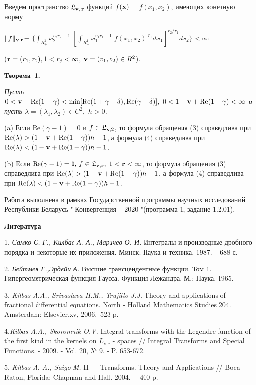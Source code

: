 Введем пространство  $\mathfrak{L}_{{\bf v},\,{\bf r}}$ функций
$f({\bf{x}})$$=f(x_{1},x_{2})$, имеющих конечную норму

\noindent$ \|f\|_{\bf{v},\bf{r}}$=
 $ \{\int_{R_{+}^{1}}x_{2}^{v_{2}r_{2}-1}$
$[\int_{R_{+}^{1}}x_{1}^{v_{1}r_{1}-1}
|f(x_{1},x_{2})|^{r_{1}}dx_{1}]^{r_{2}/r_{1}}dx_{2}\} <\infty$

 \noindent(${\bf r}=(r_{1},r_{2}), 1<{ r_{j}}<\infty$,
 ${\bf v}=(v_{1},v_{2})\in { R}^{2}$).


 \textbf{Теорема~1.} {\it Пусть
$0<{\bf
v}-\mathrm{Re}(1-\gamma)<\min[\mathrm{Re}(1+\gamma+\delta),\mathrm{Re}(\gamma-\delta)],\,\,
0<1-{\bf v}+\mathrm{Re}(1-\gamma)<\infty$ и пусть $\lambda =
(\lambda_{1},\lambda_{2})\in C^{2},\,\,h>0$.

(a) Если $\mathrm{Re}(\gamma-1)=0$ и $f\in\mathfrak{L}_{{\bf v},2}$,
то формула обращения (3)  справедлива  при
$\mathrm{Re}(\lambda)>(1-{\bf v}+\mathrm{Re}(1-\gamma))h-1$, а
формула (4) справедлива при $\mathrm{Re}(\lambda)<(1-{\bf
v}+\mathrm{Re}(1-\gamma))h-1$.

(b) Если $\mathrm{Re}(\gamma-1)=0,\,f\in\mathfrak{L}_{{\bf v},{\bf
r}},\,\,1<{\bf r}<\infty$, то формула обращения  (3) справедлива при
$\mathrm{Re}(\lambda)>(1-{\bf v}+\mathrm{Re}(1-\gamma))h-1$, а
формула (4) справедлива при $\mathrm{Re}(\lambda)<(1-{\bf
v}+\mathrm{Re}(1-\gamma))h-1$.}

Работа выполнена в рамках Государственной программы научных
исследований Республики Беларусь " Конвергенция -- 2020 "(программа
1, задание 1.2.01).

\smallskip \centerline{\bf Литература}\nopagebreak


1. {\it Самко С. Г., Килбас А. А., Маричев О. И.} Интегралы и
производные дробного порядка и некоторые их приложения. Минск: Наука
и техника, 1987. -- 688 с.

2. {\it  Бейтмен Г.,Эрдейи А.}  Высшие трансцендентные функции. Том
1. Гипергеометрическая функция Гаусса. Функция Лежандра. М.: Наука,
1965.

3. {\it Kilbas A.A., Srivastava H.M., Trujillo J.J.} Theory and
applications of fractional differential equations. North - Holland
Mathematics Studies 204. Amsterdam: Elsevier.xv, 2006.--523 p.

4.{\it Kilbas A.A., Skoromnik O.V.} Integral transforms with the
Legendre function of the first kind in the kernels on $L_{\nu,r}$ -
spaces // Integral Transforms and Special Functions. - 2009. - Vol.
20, № 9. - P. 653-672.

5. {\it  Kilbas A. A., Saigo M.} H — Transforms. Theory and
Applications // Boca Raton, Florida: Chapman and Hall. 2004.— 400 p.


